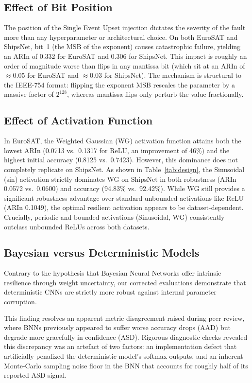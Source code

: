 \documentclass[a4paper,twoside]{article}
\begin{document}
\subsection{Effect of Bit Position}
The position of the Single Event Upset injection dictates the severity of the fault more than any hyperparameter or architectural choice. On both EuroSAT and ShipsNet, bit~1 (the MSB of the exponent) causes catastrophic failure, yielding an ARIn of 0.332 for EuroSAT and 0.306 for ShipsNet. This impact is roughly an order of magnitude worse than flips in any mantissa bit (which sit at an ARIn of $\approx$0.05 for EuroSAT and $\approx$0.03 for ShipsNet). The mechanism is structural to the IEEE-754 format: flipping the exponent MSB rescales the parameter by a massive factor of $2^{128}$, whereas mantissa flips only perturb the value fractionally.



\subsection{Effect of Activation Function}
In EuroSAT, the Weighted Gaussian (WG) activation function attains both the lowest ARIn (0.0713 vs.\ 0.1317 for ReLU, an improvement of 46\%) and the highest initial accuracy (0.8125 vs.\ 0.7423). However, this dominance does not completely replicate on ShipsNet. As shown in Table~\ref{tab:design}, the Sinusoidal (sin) activation strictly dominates WG on ShipsNet in both robustness (ARIn 0.0572 vs.\ 0.0600) and accuracy (94.83\% vs.\ 92.42\%). While WG still provides a significant robustness advantage over standard unbounded activations like ReLU (ARIn 0.1049), the optimal resilient activation appears to be dataset-dependent. Crucially, periodic and bounded activations (Sinusoidal, WG) consistently outclass unbounded ReLUs across both datasets.

\subsection{Bayesian versus Deterministic Models}
Contrary to the hypothesis that Bayesian Neural Networks offer intrinsic resilience through weight uncertainty, our corrected evaluations demonstrate that deterministic CNNs are strictly more robust against internal parameter corruption. 

This finding resolves an apparent metric disagreement raised during peer review, where BNNs previously appeared to suffer worse accuracy drops (AAD) but degrade more gracefully in confidence (ASD). Rigorous diagnostic checks revealed this discrepancy was an artefact of two factors: an implementation defect that artificially penalized the deterministic model's softmax outputs, and an inherent Monte-Carlo sampling noise floor in the BNN that accounts for roughly half of its reported ASD signal. 
\end{document}
